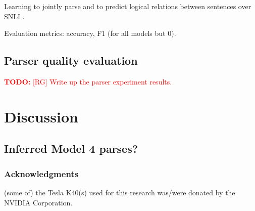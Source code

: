 \documentclass[11pt,letterpaper]{article}
\newcommand\todo[1]{\textcolor{red}{\textbf{TODO:} #1}}
\begin{document}
Learning to jointly parse and to predict logical relations between sentences over SNLI  \cite{snli:emnlp2015}.

Evaluation metrics: accuracy, F1 (for all models but 0).

\subsection{Parser quality evaluation}

\todo{[RG] Write up the parser experiment results.}

\section{Discussion}

\subsection{Inferred Model 4 parses?}

\subsubsection*{Acknowledgments}

(some of) the Tesla K40(s) used for this research was/were donated by the NVIDIA Corporation.


 
\end{document}
